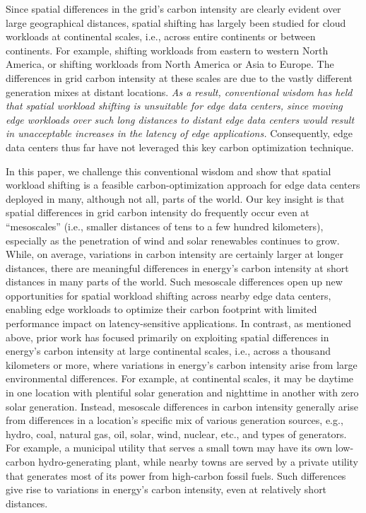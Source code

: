 Since spatial differences in the grid's carbon intensity are clearly evident over large geographical distances, spatial shifting has largely been studied for cloud workloads at continental scales, i.e., across entire continents or between continents.  For example, shifting workloads from eastern to western North America, or shifting workloads from North America or Asia to Europe. The differences in grid carbon intensity at these scales are due to the vastly different generation mixes at distant locations. { \em As a result, conventional wisdom has held that spatial workload shifting is unsuitable for edge data centers, since moving edge workloads over such long distances to distant edge data centers would result in unacceptable increases in the latency of edge applications.} Consequently, edge data centers thus far have not leveraged this key carbon optimization technique. 

In this paper, we challenge this conventional wisdom and show that spatial workload shifting is a feasible carbon-optimization approach for edge data centers deployed in many, although not all, parts of the world. Our key insight is that spatial differences in grid carbon intensity do frequently occur even at ``mesoscales'' (i.e., smaller distances of tens to a few hundred kilometers), especially as the penetration of wind and solar renewables continues to grow.  While, on average, variations in carbon intensity are certainly larger at longer distances, there are meaningful differences in energy's carbon intensity at short distances in many parts of the world.  Such mesoscale differences open up new opportunities for spatial workload shifting across nearby edge data centers, enabling edge workloads to optimize their carbon footprint with limited performance impact on latency-sensitive applications. In contrast, as mentioned above, prior work has focused primarily on exploiting spatial differences in energy's carbon intensity at large continental scales, i.e., across a thousand kilometers or more, where variations in energy's carbon intensity arise from large environmental differences.  For example, at continental scales, it may be daytime in one location with plentiful solar generation and nighttime in another with zero solar generation. Instead, mesoscale differences in carbon intensity generally arise from differences in a location's specific mix of various generation sources, e.g., hydro, coal, natural gas, oil, solar, wind, nuclear, etc., and types of generators.  For example, a municipal utility that serves a small town may have its own low-carbon hydro-generating plant, while nearby towns are served by a private utility that generates most of its power from high-carbon fossil fuels. Such differences give rise to variations in energy's carbon intensity, even at relatively short distances. 

